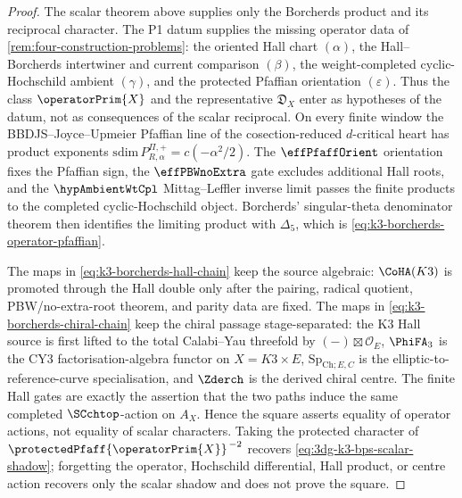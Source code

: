 \begin{proof}
The scalar theorem above supplies only the Borcherds product and its
reciprocal character. The P1 datum supplies the missing operator data of
\cref{rem:four-construction-problems}: the oriented Hall chart
\((\alpha)\), the Hall--Borcherds intertwiner and current comparison
\((\beta)\), the weight-completed cyclic-Hochschild ambient
\((\gamma)\), and the protected Pfaffian orientation
\((\varepsilon)\).  Thus the class \(\operatorPrim{X}\) and the
representative \(\mathfrak D_X\) enter as hypotheses of the datum, not
as consequences of the scalar reciprocal.  On every finite window the
BBDJS--Joyce--Upmeier Pfaffian line of the cosection-reduced
\(d\)-critical heart has product exponents
\(\mathrm{sdim}\,P^{\Pi,+}_{R,\alpha}=c(-\alpha^{2}/2)\).  The
\(\effPfaffOrient\) orientation fixes the Pfaffian sign, the
\(\effPBWnoExtra\) gate excludes additional Hall roots, and the
\(\hypAmbientWtCpl\) Mittag--Leffler inverse limit passes the finite
products to the completed cyclic-Hochschild object.  Borcherds'
singular-theta denominator theorem then identifies the limiting product
with \(\Delta_5\), which is
\eqref{eq:k3-borcherds-operator-pfaffian}.

The maps in \eqref{eq:k3-borcherds-hall-chain} keep the source
algebraic: \(\CoHA(K3)\) is promoted through the Hall double only
after the pairing, radical quotient, PBW/no-extra-root theorem, and
parity data are fixed. The maps in
\eqref{eq:k3-borcherds-chiral-chain} keep the chiral passage
stage-separated: the K3 Hall source is first lifted to the total
Calabi--Yau threefold by \((-) \boxtimes \mathcal O_E\), \(\PhiFA_3\)
is the CY3 factorisation-algebra functor on \(X=K3\times E\),
\(\mathrm{Sp}_{\mathrm{Ch};E,C}\) is the elliptic-to-reference-curve specialisation, and
\(\Zderch\) is the derived chiral centre. The finite Hall gates are
exactly the assertion that the two paths induce the same completed
\(\SCchtop\)-action on \(A_X\).  Hence
the square asserts equality of operator actions, not equality of scalar
characters. Taking the protected character of
\(\protectedPfaff{\operatorPrim{X}}^{\, -2}\) recovers
\eqref{eq:3dg-k3-bps-scalar-shadow}; forgetting the operator,
Hochschild differential, Hall product, or centre action recovers only
the scalar shadow and does not prove the square.
\end{proof}

